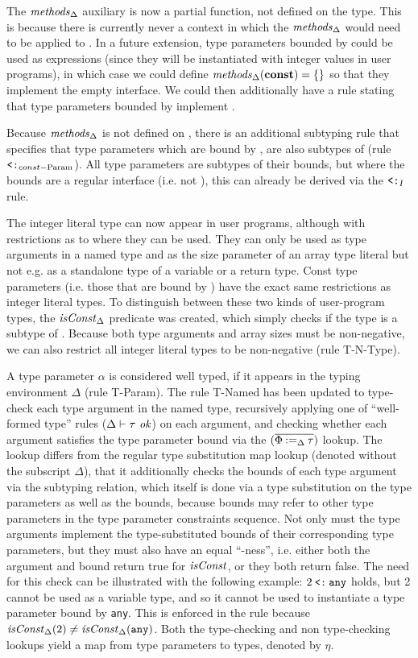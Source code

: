 The $\mathit{methods}_\Delta$ auxiliary is now a partial function, not defined on the
 type. This is because there is currently never a context in which the
$\mathit{methods}_\Delta$ would need to be applied to . In a future extension,
type parameters bounded by  could be used as expressions (since they will
be instantiated with integer values in user programs), in which case we could
define $\mathit{methods}_\Delta(\texttt{\bf const}) = \{\}$ so that they implement the empty
interface. We could then additionally have a rule stating that type parameters
bounded by  implement .

Because $\mathit{methods}_\Delta$ is not defined on , there is an additional
subtyping rule that specifies that type parameters which are bound by
, are also subtypes of  (rule $\mathbin{\texttt{<:}}_{const-\text{Param}}$).
All type parameters are subtypes of their bounds, but where the bounds are a
regular interface (i.e. not ), this can already be derived via the
$\mathbin{\texttt{<:}}_I$ rule.

The integer literal type can now appear in user programs, although with
restrictions as to where they can be used. They can only be used as type
arguments in a named type and as the size parameter of an array type literal but
not e.g. as a standalone type of a variable or a return type. Const type
parameters (i.e. those that are bound by ) have the exact same
restrictions as integer literal types. To distinguish between these two kinds of
user-program types, the $\mathit{isConst}_\Delta$ predicate was created, which simply
checks if the type is a subtype of . Because both  type
arguments and array sizes must be non-negative, we can also restrict all integer
literal types to be non-negative (rule T-N-Type).

A type parameter $\alpha$ is considered well typed, if it appears in the typing
environment $\Delta$ (rule T-Param). The rule T-Named has been updated to
type-check each type argument in the named type, recursively applying one of
``well-formed type'' rules ($\Delta \vdash \tau ~\mathit{ok}$) on each argument, and
checking whether each argument satisfies the type parameter bound via the
$(\overline{\Phi \mathbin{:=}_\Delta \tau})$ lookup. The lookup differs from the regular type
substitution map lookup (denoted without the subscript $\Delta$), that it
additionally checks the bounds of each type argument via the subtyping relation,
which itself is done via a type substitution on the type parameters as well as
the bounds, because bounds may refer to other type parameters in the type
parameter constraints sequence. Not only must the type arguments implement the
type-substituted bounds of their corresponding type parameters, but they must
also have an equal ``-ness'', i.e. either both the argument and bound
return true for $\mathit{isConst}$, or they both return false. The need for this check
can be illustrated with the following example: $2 \mathbin{\texttt{<:}} \texttt{any}$ holds, but
2 cannot be used as a variable type, and so it cannot be used to instantiate a
type parameter bound by \texttt{any}. This is enforced in the rule because
$\mathit{isConst}_\Delta(2) \neq \mathit{isConst}_\Delta(\texttt{any})$. Both the type-checking
and non type-checking lookups yield a map from type parameters to types, denoted
by $\eta$.

